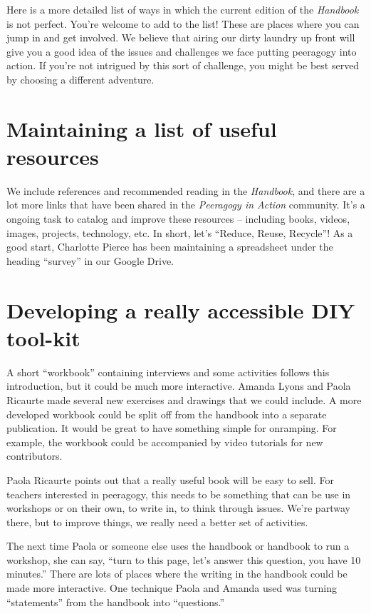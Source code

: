 Here is a more detailed list of ways in which the current edition of the
\emph{Handbook} is not perfect. You're welcome to add to the list! These
are places where you can jump in and get involved. We believe that
airing our dirty laundry up front will give you a good idea of the
issues and challenges we face putting peeragogy into action. If you're
not intrigued by this sort of challenge, you might be best served by choosing
a different adventure.

\section*{Maintaining a list of useful
resources}\label{maintaining-a-list-of-useful-resources}

We include references and recommended reading in the \emph{Handbook},
and there are a lot more links that have been shared in the \emph{Peeragogy in
Action} community. It's a ongoing task to catalog and improve these
resources -- including books, videos, images, projects, technology, etc.
In short, let's ``Reduce, Reuse, Recycle''! As a good start, Charlotte
Pierce has been maintaining a spreadsheet under the heading ``survey''
in our Google Drive.

\section*{Developing a really accessible DIY
tool-kit}\label{developing-a-really-accessible-diy-tool-kit}

A short ``workbook'' containing interviews and some activities follows
this introduction, but it could be much more interactive. Amanda Lyons
and Paola Ricaurte made several new exercises and drawings that we could
include. A more developed workbook could be split off from the handbook
into a separate publication. It would be great to have something simple
for onramping. For example, the workbook could be accompanied by video
tutorials for new contributors.

Paola Ricaurte points out that a really useful book will be easy to
sell. For teachers interested in peeragogy, this needs to be something
that can be use in workshops or on their own, to write in, to think
through issues. We're partway there, but to improve things, we really
need a better set of activities.

The next time Paola or someone else uses the handbook or handbook to run
a workshop, she can say, ``turn to this page, let's answer this
question, you have 10 minutes.'' There are lots of places where the
writing in the handbook could be made more interactive. One technique
Paola and Amanda used was turning ``statements'' from the handbook into
``questions.''

